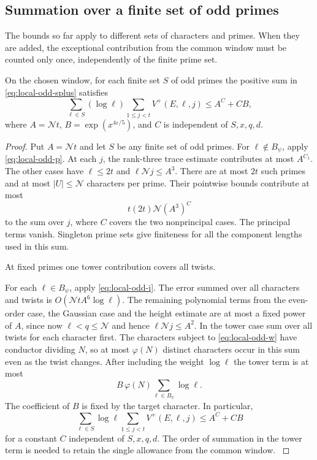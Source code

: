 \subsection{Summation over a finite set of odd primes}
\label{subsec:odd-prime-sum}

The bounds so far apply to different sets of characters and primes. When they are added, the exceptional contribution from the common window must be counted only once, independently of the finite prime set.

\begin{proposition}
On the chosen window, for each finite set \(S\) of odd primes the positive sum in \textup{\eqref{eq:local-odd-splus}} satisfies 
\[
 \sum_{\ell\in S}(\log\ell)\sum_{1\le j<t}V^+(E,\ell,j)\le A^C+CB,
\]
 where \(A=\mathcal Nt\), \(B=\exp(x^{4\varepsilon/5})\), and \(C\)
is independent of \(S,x,q,d\).
\end{proposition}

\begin{proof}

Put \(A=\mathcal Nt\) and let \(S\) be any finite set of odd
primes. For \(\ell\notin B_\psi\), apply \eqref{eq:local-odd-p}.
At each \(j\), the rank-three trace estimate contributes at most \(A^{C_1}\).
The other cases have \(\ell\le2t\) and
\(\ell\mathcal Nj\le A^3\). There are at most \(2t\) such primes and at most
\(|U|\le\mathcal N\) characters per prime. Their pointwise
bounds contribute at most
\[
       t(2t)\mathcal N(A^3)^C
\]
to the sum over \(j\), where \(C\) covers the two nonprincipal
cases. The principal terms vanish.
Singleton prime sets give finiteness for all the component
lengths used in this sum.


At fixed primes one tower contribution covers all twists.


For each \(\ell\in B_\psi\), apply \eqref{eq:local-odd-i}. The error summed
over all characters and twists is
\(O(\mathcal N t A^6\log\ell)\). The remaining polynomial terms
from the even-order case, the Gaussian case and the height
estimate are at most a fixed
power of \(A\), since now \(\ell<q\le\mathcal N\) and hence
\(\ell\mathcal Nj\le A^2\). In the tower case sum over all
twists for each character first. The characters subject to \eqref{eq:local-odd-w}
have conductor dividing \(N\), so at most \(\varphi(N)\)
distinct characters occur in this sum even as the twist
changes. After including the weight \(\log\ell\) the tower term is at most
\[
        B\,\varphi(N)\sum_{\ell\in B_\psi}\log\ell .
\]
The coefficient of \(B\) is fixed by the target character. In particular,
\[
 \sum_{\ell\in S}\log\ell\sum_{1\le j<t}V^+(E,\ell,j)
       \le A^C+C B
 \tag{S+}\label{eq:local-odd-splus}
\]
for a constant \(C\) independent of \(S,x,q,d\).
The order of summation in the tower term is needed to
retain the single allowance from the common window.
\label{cor:ordinary-odd-primes-11}

\end{proof}

